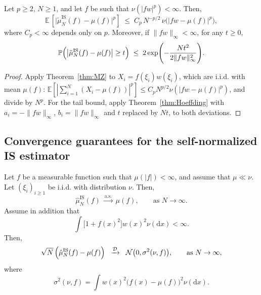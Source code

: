 \documentclass[english,graybox,envcountchap,envcountsame,sectrefs,shortlabels]{svmono}
\theoremstyle{style}
\newcommand{\eqsp}{}
\begin{document}
\begin{theorem}\label{thm:IS-oscillation}
Let $p \ge 2$, $N \ge 1$, and let $f$ be such that $\nu(|fw|^p)<\infty$. Then,
\[
\mathbb{E}\,\left[\bigl|\tilde{\mu}^{\mathrm{IS}}_{N}(f) - \mu(f)\bigr|^p\right]
\;\le\; C_p\, N^{-p/2}\,\nu\big(|fw-\mu(f)|^p\big) \eqsp,
\]
where $C_p<\infty$ depends only on $p$. Moreover, if $\|fw\|_\infty<\infty$, for any $t\ge 0$,
\[
\mathbb{P}\Bigl(
\bigl|\tilde{\mu}^{\mathrm{IS}}_{N}(f) - \mu(f)\bigr| \ge t
\Bigr)
\;\le\; 2 \exp\Biggl(
-\frac{N t^2}{2 \|f w\|_{\infty}^2}
\Biggr)\eqsp.
\]
\end{theorem}
\begin{proof}
Apply Theorem~\ref{thm:MZ} to $X_i = f(\xi_i)w(\xi_i)$, which are i.i.d. with mean $\mu(f)$: $\mathbb{E}[|\sum_{i=1}^N(X_i-\mu(f))|^p]\leq C_pN^{p/2}\nu(|fw-\mu(f)|^p)$, and divide by $N^p$. For the tail bound, apply Theorem~\ref{thm:Hoeffding} with $a_i = -\|fw\|_\infty$, $b_i = \|fw\|_\infty$ and $t$ replaced by $Nt$, to both deviations.
\end{proof}


\subsection{Convergence guarantees for the self-normalized IS estimator}


\begin{theorem}\label{thm:self-normalized-IS}
Let $f$ be a measurable function such that $\mu(|f|)<\infty$, and assume that
$\mu \ll \nu$. Let $(\xi_i)_{i\geq 1}$ be i.i.d. with
distribution $\nu$. Then,
\[
\hat{\mu}^{\mathrm{IS}}_{N}(f) \;\xrightarrow{\text{a.s.}}\; \mu(f),
\qquad \text{as } N \to \infty.
\]
Assume in addition that
\begin{equation}\label{eq:self-normalized-second-moment}
\int \bigl[1 + f(x)^2\bigr] w(x)^2
\nu(\mathrm{d}x) < \infty.
\end{equation}
Then,
\[
\sqrt{N}\,\Bigl(\hat{\mu}^{\mathrm{IS}}_{N}(f) - \mu(f)\Bigr)
\;\;\xrightarrow{\mathcal{D}}\;\;
\mathcal{N}\bigl(0, \sigma^2(\nu,f)\bigr),
\qquad \text{as } N\to\infty,
\]
where
\begin{equation}\label{eq:self-normalized-variance}
\sigma^2(\nu,f) = \int w(x)^2
\bigl(f(x) - \mu(f)\bigr)^2 \nu(\mathrm{d}x)\eqsp.
\end{equation}
\end{theorem}
\end{document}
